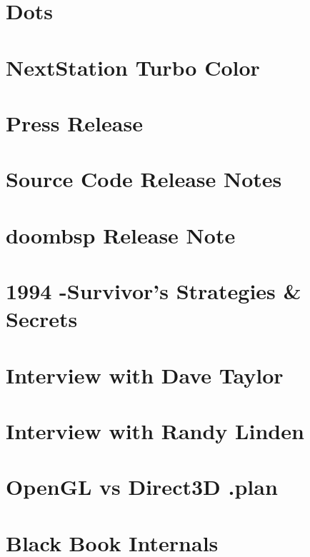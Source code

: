 \documentclass{book}
\begin{document}
    \chapter{Dots}  
      


    \chapter{NextStation Turbo Color}
    
    
      \chapter{Press Release}
      
      \chapter{Source Code Release Notes}
      
      \chapter{doombsp Release Note}
      
      \chapter{1994 -Survivor's Strategies \& Secrets}
      
   
      \chapter{Interview with Dave Taylor}
      
      \chapter{Interview with Randy Linden}
            
      \chapter{OpenGL vs Direct3D .plan}
      
        \chapter{Black Book Internals}
    
    \cleartoleftpage %
    
\end{document}
